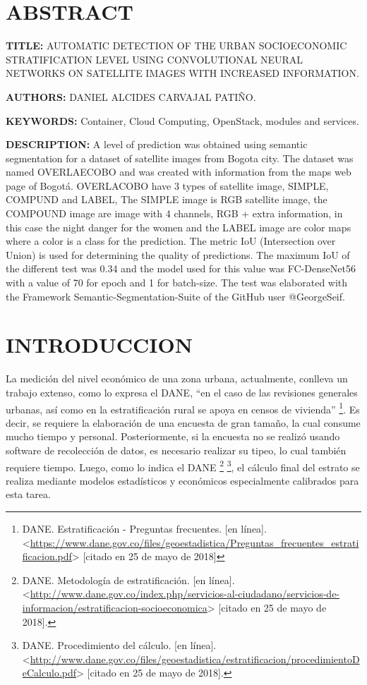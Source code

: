   
	\newpage\chapter*{ABSTRACT}
    \textbf{TITLE:} AUTOMATIC DETECTION OF THE URBAN SOCIOECONOMIC STRATIFICATION LEVEL USING CONVOLUTIONAL NEURAL NETWORKS ON SATELLITE IMAGES WITH INCREASED INFORMATION.
    
    \textbf{AUTHORS:} DANIEL ALCIDES CARVAJAL PATIÑO.
    
    \textbf{KEYWORDS:} Container, Cloud Computing, OpenStack, modules and services.
    
    \textbf{DESCRIPTION:} A level of prediction was obtained using semantic segmentation for a dataset of satellite images from Bogota city.  The dataset was named OVERLAECOBO and was created with information from the maps web page of Bogotá. OVERLACOBO have 3 types of satellite image, SIMPLE, COMPUND and LABEL, The SIMPLE image is RGB satellite image,  the COMPOUND image are image with 4 channels, RGB + extra information, in this case the night danger for the women and the LABEL image are color maps where a color is a class for the prediction. The metric IoU (Intersection over Union) is used for determining the quality of predictions. The maximum IoU of the different test was 0.34 and the model used for this value was FC-DenseNet56 with a value of 70 for epoch and 1 for batch-size. The test was elaborated with the Framework Semantic-Segmentation-Suite of the GitHub user @GeorgeSeif. 
    
\newpage\chapter*{INTRODUCCION}

La medición del nivel económico de una zona urbana, actualmente, conlleva un trabajo extenso, como lo expresa el DANE, “en el caso de las revisiones generales urbanas, así como en la estratificación rural se apoya en censos de vivienda” \footnote[1]{DANE. Estratificación - Preguntas frecuentes. [en línea]. <\url{https://www.dane.gov.co/files/geoestadistica/Preguntas_frecuentes_estratificacion.pdf}> [citado en 25 de mayo de 2018]}. Es decir, se requiere la elaboración de una encuesta de gran tamaño, la cual consume mucho tiempo y personal. Posteriormente, si la encuesta no se realizó usando software de recolección de datos, es necesario realizar su tipeo, lo cual también requiere tiempo. Luego, como lo indica el DANE \footnote[2]{DANE. Metodología de estratificación. [en línea]. <\url{http://www.dane.gov.co/index.php/servicios-al-ciudadano/servicios-de-informacion/estratificacion-socioeconomica}> [citado en 25 de mayo de 2018].} \footnote[3]{DANE. Procedimiento del cálculo. [en línea]. <\url{http://www.dane.gov.co/files/geoestadistica/estratificacion/procedimientoDeCalculo.pdf}> [citado en 25 de mayo de 2018].}, el cálculo final del estrato se realiza mediante modelos estadísticos y económicos especialmente calibrados para esta tarea.
    
